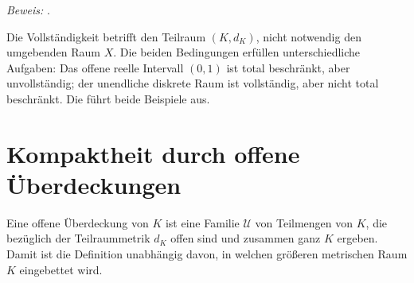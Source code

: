 \noindent\emph{Beweis:} .

Die Vollständigkeit betrifft den Teilraum \((K,d_K)\), nicht notwendig den
umgebenden Raum \(X\). Die beiden Bedingungen erfüllen unterschiedliche
Aufgaben: Das offene reelle Intervall \((0,1)\) ist total beschränkt,
aber unvollständig; der unendliche diskrete Raum ist vollständig, aber
nicht total beschränkt. Die \CompactnessReadingLink{} führt beide Beispiele aus.

\section{Kompaktheit durch offene Überdeckungen}

Eine offene Überdeckung von \(K\) ist eine Familie \(\mathcal U\) von
Teilmengen von \(K\), die bezüglich der Teilraummetrik \(d_K\) offen sind
und zusammen ganz \(K\) ergeben. Damit ist die Definition unabhängig
davon, in welchen größeren metrischen Raum \(K\) eingebettet wird.


